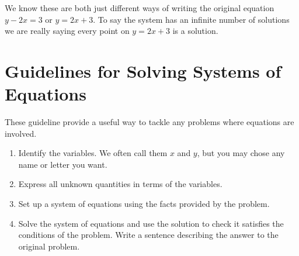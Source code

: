  We know these are both just different ways of writing the original equation $y -2 x =3$ or $y =2 x +3$. To say the system has an infinite number of solutions we are really saying every point
 on $y =2 x +3$ is a solution. 
 
 
 
 \section*{Guidelines for Solving Systems of Equations}
 These guideline provide a useful way to tackle any problems where equations are involved. 
 \begin{tcolorbox}
 	
  \begin{enumerate}\setlength\itemsep{0em}
 	\item Identify the variables. We often call them $x$ and $y$, but you may chose any name or letter you want. 	
 	\item Express all unknown quantities in terms of the variables. 	
 	\item Set up a system of equations using the facts provided by the problem.	
 	\item Solve the system of equations and use the solution to check it satisfies the conditions of the
 	problem. Write a sentence describing the answer to the original problem.  
 \end{enumerate}
\end{tcolorbox}
 
